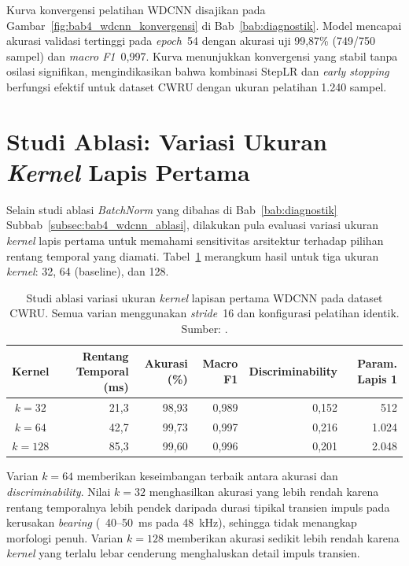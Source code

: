 Kurva konvergensi pelatihan WDCNN disajikan pada
Gambar~\ref{fig:bab4_wdcnn_konvergensi} di Bab~\ref{bab:diagnostik}.
Model mencapai akurasi validasi tertinggi pada \emph{epoch}~54 dengan
akurasi uji 99,87\% (749/750 sampel) dan \emph{macro F1}~0,997.
Kurva menunjukkan konvergensi yang stabil tanpa osilasi signifikan,
mengindikasikan bahwa kombinasi StepLR dan \emph{early stopping}
berfungsi efektif untuk dataset CWRU dengan ukuran pelatihan 1.240
sampel.

\section{Studi Ablasi: Variasi Ukuran \emph{Kernel} Lapis Pertama}
\label{lamp:wdcnn_ablasi_kernel}

Selain studi ablasi \emph{BatchNorm} yang dibahas di
Bab~\ref{bab:diagnostik} Subbab~\ref{subsec:bab4_wdcnn_ablasi}, dilakukan
pula evaluasi variasi ukuran \emph{kernel} lapis pertama untuk
memahami sensitivitas arsitektur terhadap pilihan rentang temporal
yang diamati. Tabel~\ref{tab:lampG_ablasi_kernel} merangkum hasil
untuk tiga ukuran \emph{kernel}: 32, 64 (baseline), dan 128.

\begin{table}[ht]
  \centering
  \caption{Studi ablasi variasi ukuran \emph{kernel} lapisan pertama
           WDCNN pada dataset CWRU. Semua varian menggunakan
           \emph{stride}~16 dan konfigurasi pelatihan identik.
           Sumber: .}
  \label{tab:lampG_ablasi_kernel}
  \footnotesize
  \begin{tabular}{@{}crrrrr@{}}
    \toprule
    \textbf{Kernel} & \textbf{Rentang Temporal (ms)} &
    \textbf{Akurasi (\%)} & \textbf{Macro F1} &
    \textbf{Discriminability} & \textbf{Param. Lapis 1} \\
    \midrule
    $k=32$  & 21,3 & 98,93 & 0,989 & 0,152 & 512 \\
    $k=64$  & 42,7 & 99,73 & 0,997 & 0,216 & 1.024 \\
    $k=128$ & 85,3 & 99,60 & 0,996 & 0,201 & 2.048 \\
    \bottomrule
  \end{tabular}
\end{table}

Varian $k=64$ memberikan keseimbangan terbaik antara akurasi
dan \emph{discriminability}. Nilai $k=32$ menghasilkan akurasi
yang lebih rendah karena rentang temporalnya lebih pendek daripada
durasi tipikal transien impuls pada kerusakan \emph{bearing} (~40--50~ms
pada 48~kHz), sehingga tidak menangkap morfologi penuh. Varian
$k=128$ memberikan akurasi sedikit lebih rendah karena \emph{kernel}
yang terlalu lebar cenderung menghaluskan detail impuls transien.

